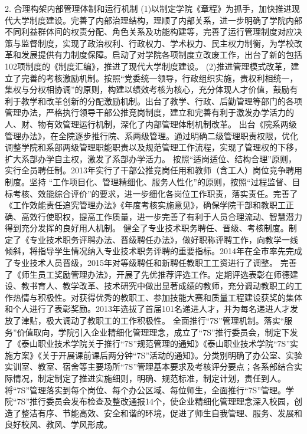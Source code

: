 2. 合理构架内部管理体制和运行机制
(1)以制定学院《章程》为抓手，加快推进现代大学制度建设。完善了内部治理结构，理顺了内部关系，进一步明确了学院内部不同利益群体间的权责分配、角色关系及功能构建等，完善了运行管理制度对应决策与监督制度，实现了政治权利、行政权力、学术权力、民主权力制衡，为学校改革和发展提供有力制度保障。启动了对学院各项制度立改废工作，出台了新的包括102项制度的《制度汇编》，推进了现代大学制度建设。
(2)推进管理模式改革，建立了完善的考核激励机制。按照“党委统一领导，行政组织实施，责权利相统一，集权与分权相协调”的原则，构建以绩效考核为核心，充分体现人才价值，鼓励有利于教学和改革创新的分配激励机制。出台了教学、行政、后勤管理等部门的各项管理办法，严格执行领导干部公推竞岗制度，建立和完善有利于激发办学活力的人、财、物有效管理运行机制，深化了内部管理体制机制改革。
出台《院系两级管理办法》，在全院逐步推行院、系两级管理。通过明确二级管理职责权限，优化调整学院和系部两级管理职能职责以及规范管理工作流程，实现了管理权的下移，扩大系部办学自主权，激发了系部办学活力。
按照“适岗适位、结构合理”原则，实行全员聘任制。2013年实行了干部公推竞岗任用和教师（含工人）岗位竞争聘用制度。坚持 “工作项目化、管理精细化、服务人性化”的原则，按照“过程监督、目标考核、效能综合评价”的要求，进一步细化各岗位工作职责，落实责任。完善了《工作效能责任追究管理办法》《年度考核实施意见》，确保学院干部和教职工正确、高效行使职权，提高工作质量，进一步完善了有利于人员合理流动、智慧潜力得到充分发挥的良好用人机制。
健全了专业技术职务聘任、晋级、考核制度。制定了《专业技术职务评聘办法、晋级聘任办法》，做好职称评聘工作，向教学一线倾斜，将指导学生情况纳入专业技术职务评聘的重要指标。2014年在全市率先完成了专业技术人员晋级，2015年对等级聘任和新聘任教职工工资进行了调整。
完善了《师生员工奖励管理办法》，开展了先优推荐评选工作。定期评选表彰在师德建设、教书育人、教学改革、技术研究中做出显著成绩的教师，充分调动教职工的工作热情与积极性。对获得优秀的教职工、参加技能大赛和质量工程建设获奖的集体和个人进行了表彰奖励。2013年选拔了首届101名递进人才，并为每名递进人才发放了津贴，极大调动了教职工的工作积极性。
全面推行“7S”管理机制。落实“服务”价值取向，学院引入企业精细化管理理念，成立了“7S”推行委员会，制定下发了《泰山职业技术学院关于推行“7S”规范管理的通知》《泰山职业技术学院“7S”实施方案》《关于开展课前课后两分钟“7S”活动的通知》。分类别明确了办公室、实验实训室、教室、宿舍等主要场所“7S”管理基本要求及考核评分要点；各系部结合实际情况，制定制定了推进实施细则，明确、规范标准，制定计划，责任到人。将“7S”管理落实到每个岗位、每个办公区域、每位师生，全面推行“7S”管理。学院“7S”推行委员会发布检查及整改通报14个，使企业精细化管理理念深入校园，创造了整洁有序、节能高效、安全和谐的环境，促进了师生自我管理、服务、发展和良好校风、教风、学风形成。
